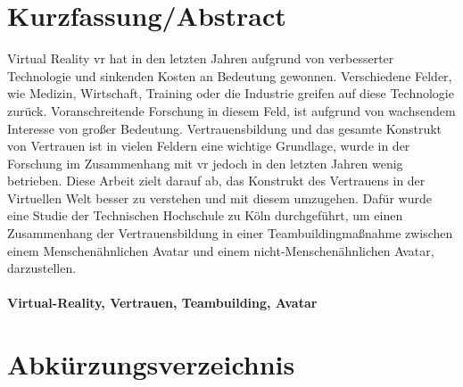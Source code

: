 \documentclass[a4paper,11pt]{article}%
\renewcommand{\\}{\vspace*{0.5\baselineskip} \newline}
\begin{document}
\section*{Kurzfassung/Abstract}
	Virtual Reality \ac{vr} hat in den letzten Jahren aufgrund von verbesserter Technologie und sinkenden Kosten an Bedeutung gewonnen. Verschiedene Felder, wie Medizin, Wirtschaft, Training oder die Industrie greifen auf diese Technologie zurück. Voranschreitende Forschung in diesem Feld, ist aufgrund von wachsendem Interesse von großer Bedeutung. Vertrauensbildung und das gesamte Konstrukt von Vertrauen ist in vielen Feldern eine wichtige Grundlage, wurde in der Forschung im Zusammenhang mit \ac{vr} jedoch in den letzten Jahren wenig betrieben. Diese Arbeit zielt darauf ab, das Konstrukt des Vertrauens in der Virtuellen Welt besser zu verstehen und mit diesem umzugehen. Dafür wurde eine Studie der Technischen Hochschule zu Köln durchgeführt, um einen Zusammenhang der Vertrauensbildung in einer Teambuildingmaßnahme zwischen einem Menschenähnlichen Avatar und einem nicht-Menschenähnlichen Avatar, darzustellen.
	
			\paragraph{Virtual-Reality, Vertrauen, Teambuilding, Avatar}
	\newpage
	\tableofcontents
	\newpage
	
\section*{Abkürzungsverzeichnis}
	
	
	\newpage
	
%	
	
\end{document}
